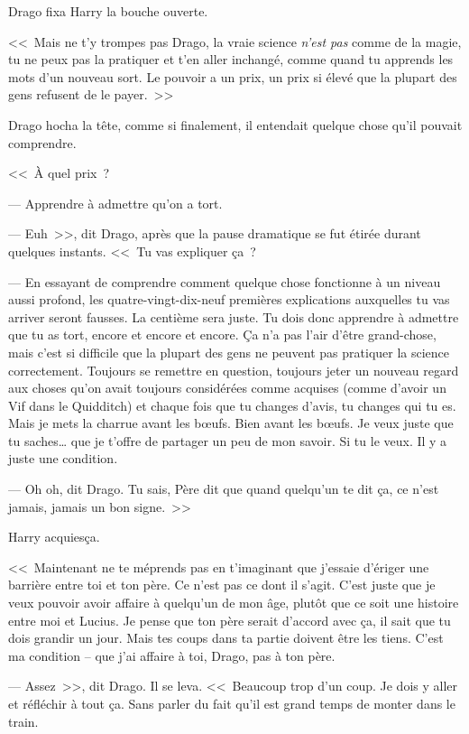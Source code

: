 Drago fixa Harry la bouche ouverte.

<<~Mais ne t'y trompes pas Drago, la vraie science \emph{n'est pas} comme de la magie, tu ne peux pas la pratiquer et t'en aller inchangé, comme quand tu apprends les mots d'un nouveau sort. Le pouvoir a un prix, un prix si élevé que la plupart des gens refusent de le payer.~>>

Drago hocha la tête, comme si finalement, il entendait quelque chose qu'il pouvait comprendre.

<<~À quel prix~?

--- Apprendre à admettre qu'on a tort.

--- Euh~>>, dit Drago, après que la pause dramatique se fut étirée durant quelques instants. <<~Tu vas expliquer ça~?

--- En essayant de comprendre comment quelque chose fonctionne à un niveau aussi profond, les quatre-vingt-dix-neuf premières explications auxquelles tu vas arriver seront fausses. La centième sera juste. Tu dois donc apprendre à admettre que tu as tort, encore et encore et encore. Ça n'a pas l'air d'être grand-chose, mais c'est si difficile que la plupart des gens ne peuvent pas pratiquer la science correctement. Toujours se remettre en question, toujours jeter un nouveau regard aux choses qu'on avait toujours considérées comme acquises (comme d'avoir un Vif dans le Quidditch) et chaque fois que tu changes d'avis, tu changes qui tu es. Mais je mets la charrue avant les bœufs. Bien avant les bœufs. Je veux juste que tu saches… que je t'offre de partager un peu de mon savoir. Si tu le veux. Il y a juste une condition.

--- Oh oh, dit Drago. Tu sais, Père dit que quand quelqu'un te dit ça, ce n'est jamais, jamais un bon signe.~>>

Harry acquiesça.

<<~Maintenant ne te méprends pas en t'imaginant que j'essaie d'ériger une barrière entre toi et ton père. Ce n'est pas ce dont il s'agit. C'est juste que je veux pouvoir avoir affaire à quelqu'un de mon âge, plutôt que ce soit une histoire entre moi et Lucius. Je pense que ton père serait d'accord avec ça, il sait que tu dois grandir un jour. Mais tes coups dans ta partie doivent être les tiens. C'est ma condition -- que j'ai affaire à toi, Drago, pas à ton père.

--- Assez~>>, dit Drago. Il se leva. <<~Beaucoup trop d'un coup. Je dois y aller et réfléchir à tout ça. Sans parler du fait qu'il est grand temps de monter dans le train.

